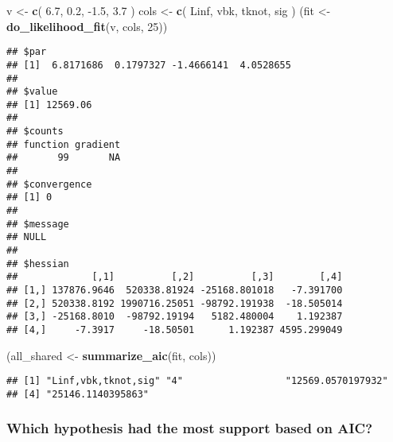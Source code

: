 \documentclass[
]{article}
\newenvironment{Shaded}{\begin{snugshade}}{\end{snugshade}}
\newcommand{\DecValTok}[1]{\textcolor[rgb]{0.00,0.00,0.81}{#1}}
\newcommand{\FloatTok}[1]{\textcolor[rgb]{0.00,0.00,0.81}{#1}}
\newcommand{\KeywordTok}[1]{\textcolor[rgb]{0.13,0.29,0.53}{\textbf{#1}}}
\newcommand{\NormalTok}[1]{#1}
\newcommand{\StringTok}[1]{\textcolor[rgb]{0.31,0.60,0.02}{#1}}
\begin{document}
\begin{Shaded}
\begin{Highlighting}[]
\NormalTok{v \textless{}{-}}\StringTok{ }\KeywordTok{c}\NormalTok{(}
  \FloatTok{6.7}\NormalTok{, }\FloatTok{0.2}\NormalTok{, }\FloatTok{{-}1.5}\NormalTok{,  }\FloatTok{3.7}
\NormalTok{) }
\NormalTok{cols \textless{}{-}}\StringTok{ }\KeywordTok{c}\NormalTok{(}
  \StringTok{\textquotesingle{}Linf\textquotesingle{}}\NormalTok{, }\StringTok{\textquotesingle{}vbk\textquotesingle{}}\NormalTok{, }\StringTok{\textquotesingle{}tknot\textquotesingle{}}\NormalTok{, }\StringTok{\textquotesingle{}sig\textquotesingle{}}
\NormalTok{)}
\NormalTok{(fit \textless{}{-}}\StringTok{ }\KeywordTok{do\_likelihood\_fit}\NormalTok{(v, cols, }\DecValTok{25}\NormalTok{))}
\end{Highlighting}
\end{Shaded}

\begin{verbatim}
## $par
## [1]  6.8171686  0.1797327 -1.4666141  4.0528655
## 
## $value
## [1] 12569.06
## 
## $counts
## function gradient 
##       99       NA 
## 
## $convergence
## [1] 0
## 
## $message
## NULL
## 
## $hessian
##             [,1]          [,2]          [,3]        [,4]
## [1,] 137876.9646  520338.81924 -25168.801018   -7.391700
## [2,] 520338.8192 1990716.25051 -98792.191938  -18.505014
## [3,] -25168.8010  -98792.19194   5182.480004    1.192387
## [4,]     -7.3917     -18.50501      1.192387 4595.299049
\end{verbatim}

\begin{Shaded}
\begin{Highlighting}[]
\NormalTok{(all\_shared \textless{}{-}}\StringTok{ }\KeywordTok{summarize\_aic}\NormalTok{(fit, cols))}
\end{Highlighting}
\end{Shaded}

\begin{verbatim}
## [1] "Linf,vbk,tknot,sig" "4"                  "12569.0570197932"  
## [4] "25146.1140395863"
\end{verbatim}

\hypertarget{which-hypothesis-had-the-most-support-based-on-aic}{%
\subsubsection{Which hypothesis had the most support based on
AIC?}\label{which-hypothesis-had-the-most-support-based-on-aic}}
\end{document}
